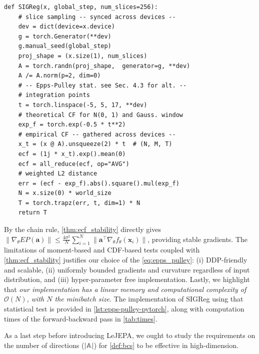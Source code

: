 \begin{lstfloat}[t!]
\begin{lstlisting}[caption={SIGReg with Epps-Pulley statistic with DDP support and $\mathcal{O}(N)$ time and memory complexity. x is a (N, K) tensor, num\_slices is $|\sA|$ in \cref{def:bcs}, `global\_step` is used for sync. sampling across GPUs and can be omited for single-GPU training. An optimized implementation with caching is also provided in our official codebase, computation times provided in \cref{tab:times}.},label={lst:epps-pulley-pytorch}]
def SIGReg(x, global_step, num_slices=256):
    # slice sampling -- synced across devices --
    dev = dict(device=x.device)
    g = torch.Generator(**dev)
    g.manual_seed(global_step)
    proj_shape = (x.size(1), num_slices)
    A = torch.randn(proj_shape,  generator=g, **dev)
    A /= A.norm(p=2, dim=0)
    # -- Epps-Pulley stat. see Sec. 4.3 for alt. --
    # integration points
    t = torch.linspace(-5, 5, 17, **dev)
    # theoretical CF for N(0, 1) and Gauss. window
    exp_f = torch.exp(-0.5 * t**2)
    # empirical CF -- gathered across devices --
    x_t = (x @ A).unsqueeze(2) * t  # (N, M, T)
    ecf = (1j * x_t).exp().mean(0)
    ecf = all_reduce(ecf, op="AVG")
    # weighted L2 distance
    err = (ecf - exp_f).abs().square().mul(exp_f)
    N = x.size(0) * world_size
    T = torch.trapz(err, t, dim=1) * N
    return T
\end{lstlisting}
\end{lstfloat}




By the chain rule, \cref{thm:ecf_stability} directly gives $
\left\|\nabla_\theta EP(\mathbf{a})\right\| \le \frac{4\sigma^2}{N} \sum_{i=1}^N \|\mathbf{a}^\top \nabla_\theta f_\theta(\mathbf{x}_i)\|$, 
providing stable gradients. The limitations of moment-based and CDF-based tests coupled with \cref{thm:ecf_stability} justifies our choice of the \eqref{eq:epps_pulley}: (i) DDP-friendly and scalable, (ii) 
uniformly bounded gradients and curvature regardless of input distribution, and (iii) hyper-parameter free implementation. Lastly, we highlight that {\em our implementation has a linear memory and computational complexity of $\mathcal{O}(N)$, with $N$ the minibatch size}. The implementation of SIGReg using that statistical test is provided in \cref{lst:epps-pulley-pytorch}, along with computation times of the forward-backward pass in \cref{tab:times}.


As a last step before introducing LeJEPA, we ought to study the requirements on the number of directions ($|{\mathbb{A}}|$) for \eqref{def:bcs} to be effective in high-dimension.



